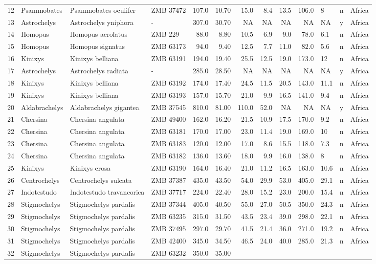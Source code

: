 \begin{landscape}
{\begin{longtable}[]{@{}llllrrrrrrlll@{}}
	12 & Psammobates & Psammobates oculifer & ZMB 37472 & 107.0 & 10.70 &
	15.0 & 8.4 & 13.5 & 106.0 & 8 & n & Africa\tabularnewline
	13 & Astrochelys & Astrochelys yniphora & - & 307.0 & 30.70 & NA & NA &
	NA & NA & NA & y & Africa\tabularnewline
	14 & Homopus & Homopus aerolatus & ZMB 229 & 88.0 & 8.80 & 10.5 & 6.9 &
	9.0 & 78.0 & 6.1 & n & Africa\tabularnewline
	15 & Homopus & Homopus signatus & ZMB 63173 & 94.0 & 9.40 & 12.5 & 7.7 &
	11.0 & 82.0 & 5.6 & n & Africa\tabularnewline
	16 & Kinixys & Kinixys belliana & ZMB 63191 & 194.0 & 19.40 & 25.5 &
	12.5 & 19.0 & 173.0 & 12 & n & Africa\tabularnewline
	17 & Astrochelys & Astrochelys radiata & - & 285.0 & 28.50 & NA & NA &
	NA & NA & NA & y & Africa\tabularnewline
	18 & Kinixys & Kinixys belliana & ZMB 63192 & 174.0 & 17.40 & 24.5 &
	11.5 & 20.5 & 143.0 & 11.1 & n & Africa\tabularnewline
	19 & Kinixys & Kinixys belliana & ZMB 63193 & 157.0 & 15.70 & 21.0 & 9.9
	& 16.5 & 141.0 & 9.4 & n & Africa\tabularnewline
	20 & Aldabrachelys & Aldabrachelys gigantea & ZMB 37545 & 810.0 & 81.00
	& 110.0 & 52.0 & NA & NA & NA & y & Africa\tabularnewline
	21 & Chersina & Chersina angulata & ZMB 49400 & 162.0 & 16.20 & 21.5 &
	10.9 & 17.5 & 170.0 & 9.2 & n & Africa\tabularnewline
	22 & Chersina & Chersina angulata & ZMB 63181 & 170.0 & 17.00 & 23.0 &
	11.4 & 19.0 & 169.0 & 10 & n & Africa\tabularnewline
	23 & Chersina & Chersina angulata & ZMB 63183 & 120.0 & 12.00 & 17.0 &
	8.6 & 15.5 & 118.0 & 7.3 & n & Africa\tabularnewline
	24 & Chersina & Chersina angulata & ZMB 63182 & 136.0 & 13.60 & 18.0 &
	9.9 & 16.0 & 138.0 & 8 & n & Africa\tabularnewline
	25 & Kinixys & Kinixys erosa & ZMB 63190 & 164.0 & 16.40 & 21.0 & 11.2 &
	16.5 & 163.0 & 10.6 & n & Africa\tabularnewline
	26 & Centrochelys & Centrochelys sulcata & ZMB 37387 & 435.0 & 43.50 &
	54.0 & 29.9 & 53.0 & 405.0 & 29.1 & n & Africa\tabularnewline
	27 & Indotestudo & Indotestudo travancorica & ZMB 37717 & 224.0 & 22.40
	& 28.0 & 15.2 & 23.0 & 200.0 & 15.4 & n & Africa\tabularnewline
	28 & Stigmochelys & Stigmochelys pardalis & ZMB 37344 & 405.0 & 40.50 &
	55.0 & 27.0 & 50.5 & 350.0 & 24.3 & n & Africa\tabularnewline
	29 & Stigmochelys & Stigmochelys pardalis & ZMB 63235 & 315.0 & 31.50 &
	43.5 & 23.4 & 39.0 & 298.0 & 22.1 & n & Africa\tabularnewline
	30 & Stigmochelys & Stigmochelys pardalis & ZMB 37495 & 297.0 & 29.70 &
	41.5 & 21.4 & 36.0 & 271.0 & 19.2 & n & Africa\tabularnewline
	31 & Stigmochelys & Stigmochelys pardalis & ZMB 42400 & 345.0 & 34.50 &
	46.5 & 24.0 & 40.0 & 285.0 & 21.3 & n & Africa\tabularnewline
	32 & Stigmochelys & Stigmochelys pardalis & ZMB 63232 & 350.0 & 35.00 &

\end{longtable}}
\end{landscape}
